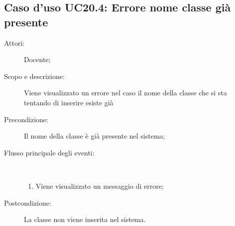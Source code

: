 \subsection{Caso d'uso UC20.4: Errore nome classe già presente}\begin{description}
\item[Attori:] Docente;
\item[Scopo e descrizione:] Viene visualizzato un errore nel caso il nome della classe che si sta tentando di inserire esiste già
      \item[Precondizione:] Il nome della classe è già presente nel sistema;

        \item[Flusso principale degli eventi:] \ 
 \begin{enumerate}
          \item Viene visualizzato un messaggio di errore;

      \end{enumerate}
    \item[Postcondizione:] La classe non viene inserita nel sistema.
  \end{description}
\hypertarget{UC21}{}
